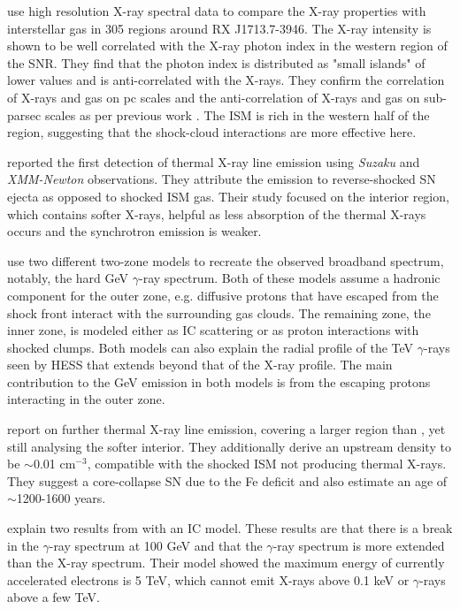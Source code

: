 \documentclass[12pt,a4paper]{article}
\begin{document}
\cite{2015ApJ...799..175S} use high resolution X-ray spectral data to compare the X-ray properties with interstellar gas in 305 regions around RX J1713.7-3946. The X-ray intensity is shown to be well correlated with the X-ray photon index in the western region of the SNR. They find that the photon index is distributed as "small islands" of lower values and is anti-correlated with the X-rays. They confirm the correlation of X-rays and gas on pc scales and the anti-correlation of X-rays and gas on sub-parsec scales as per previous work \citep{2010ApJ...724...59S, 2013ApJ...778...59S}. The ISM is rich in the western half of the region, suggesting that the shock-cloud interactions are more effective here. 


\cite{2015ApJ...814...29K} reported the first detection of thermal X-ray line emission using \textit{Suzaku} and \textit{XMM-Newton} observations. They attribute the emission to reverse-shocked SN ejecta as opposed to shocked ISM gas. Their study focused on the interior region, which contains softer X-rays, helpful as less absorption of the thermal X-rays occurs and the synchrotron emission is weaker. 

\cite{2016ApJ...821...43Z} use two different two-zone models to recreate the observed broadband spectrum, notably, the hard GeV $\gamma$-ray spectrum. Both of these models assume a hadronic component for the outer zone, e.g. diffusive protons that have escaped from the shock front interact with the surrounding gas clouds. The remaining zone, the inner zone, is modeled either as IC scattering or as proton interactions with shocked clumps. Both models can also explain the radial profile of the TeV $\gamma$-rays seen by HESS that extends beyond that of the X-ray profile. The main contribution to the GeV emission in both models is from the escaping protons interacting in the outer zone. 

\cite{2017IAUS..331..206K} report on further thermal X-ray line emission, covering a larger region than \cite{2015ApJ...814...29K}, yet still analysing the softer interior. They additionally derive an upstream density to be $\sim$0.01 cm$^{-3}$, compatible with the shocked ISM not producing thermal X-rays. They suggest a core-collapse SN due to the Fe deficit and also estimate an age of $\sim$1200-1600 years.

\cite{2017JHEAp..13...17O} explain two results from \cite{2018A&A...612A...6H} with an IC model. These results are that there is a break in the $\gamma$-ray spectrum at 100 GeV and that the $\gamma$-ray spectrum is more extended than the X-ray spectrum. Their model showed the maximum energy of currently accelerated electrons is 5 TeV, which cannot emit X-rays above 0.1 keV or $\gamma$-rays above a few TeV. 
\end{document}
